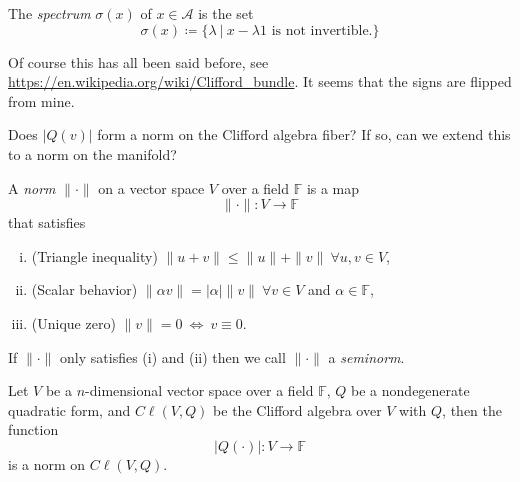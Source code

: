 \begin{definition}
The \emph{spectrum} $\sigma(x)$ of $x\in \mathcal{A}$ is the set
\[
\sigma(x) \coloneqq \{ \lambda ~\vert~ x-\lambda 1 \textrm{ is not invertible.}\}
\]
\end{definition}

Of course this has all been said before, see \url{https://en.wikipedia.org/wiki/Clifford_bundle}. It seems that the signs are flipped from mine.

\begin{question}
Does $|Q(v)|$ form a norm on the Clifford algebra fiber? If so, can we extend this to a norm on the manifold?
\end{question}

\begin{definition}
A \emph{norm} $\|\cdot\|$ on a vector space $V$ over a field $\mathbb{F}$ is a map
\[
\|\cdot \| \colon V \to \mathbb{F}
\]
that satisfies
\begin{enumerate}[(i)]
    \item (Triangle inequality) $\|u+v\|\leq \|u\|+\|v\|~\forall u,v\in V$,
    \item (Scalar behavior) $\|\alpha v\| = |\alpha|\|v\|~\forall v\in V$ and $\alpha \in \mathbb{F}$,
    \item (Unique zero) $\|v\|=0 ~\iff~ v\equiv 0$.
\end{enumerate}
If $\|\cdot \|$ only satisfies (i) and (ii) then we call $\|\cdot \|$ a \emph{seminorm}.
\end{definition}

\begin{proposition}
Let $V$ be a $n$-dimensional vector space over a field $\mathbb{F}$, $Q$ be a nondegenerate quadratic form, and $C\ell(V,Q)$ be the Clifford algebra over $V$ with $Q$, then the function
\[
|Q(\cdot)| \colon V \to \mathbb{F}
\]
is a norm on $C\ell(V,Q)$.
\end{proposition}

